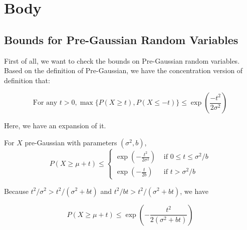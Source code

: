 

\section{Body}

\subsection{Bounds for Pre-Gaussian Random Variables}
First of all, we want to check the bounds on Pre-Gaussian random variables.
Based on the definition of Pre-Gaussian, we have the concentration version of definition that:
\begin{theorem}
  \begin{equation}
    \text{For any } t>0, \max \{P(X \geq t), P(X \leq -t) \} \leq \exp(\frac{-t^2}{2 \sigma^2})
  \end{equation}
\end{theorem}

Here, we have an expansion of it.

\begin{lemma} \cite*{Bartlett:2020}
  For $X$ pre-Gaussian with parameters $(\sigma^2, b)$,
  \begin{equation}
    P(X \geq \mu+t) \leq\left\{\begin{array}{ll}
    \exp \left(-\frac{t^{2}}{2 \sigma^{2}}\right) & \text { if } 0 \leq t \leq \sigma^{2} / b \\
    \exp \left(-\frac{t}{2 b}\right) & \text { if } t>\sigma^{2} / b
    \end{array}\right.
  \end{equation}
\end{lemma}

Because $t^2/ \sigma^2 > t^2/ (\sigma^2 + bt)$ and $t^2/ bt > t^2/ (\sigma^2 + bt)$, we have

\begin{equation}
  P(X \geq \mu+t) \leq 
  \exp \left(-\frac{t^{2}}{2 (\sigma^2 + bt)}\right) 
\end{equation}

